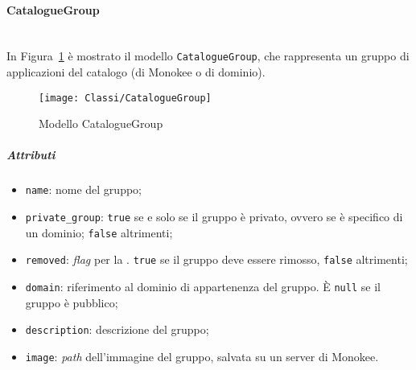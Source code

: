 \paragraph{CatalogueGroup} \mbox{} \\
In Figura~\ref{fig:CatalogueGroup} è mostrato il modello \texttt{CatalogueGroup}, che rappresenta un gruppo di applicazioni del catalogo (di Monokee o di dominio).
\begin{figure}[hbpc]
  \begin{center}
    \texttt{[image: Classi/CatalogueGroup]}
  \caption[Modello CatalogueGroup]{Modello CatalogueGroup}
  \label{fig:CatalogueGroup}
  \end{center} 
\end{figure}
\subparagraph{Attributi}
\begin{itemize}
\item \texttt{name}: nome del gruppo;
\item \texttt{private\_group}: \texttt{true} se e solo se il gruppo è privato, ovvero se è specifico di un dominio; \texttt{false} altrimenti;
\item \texttt{removed}: \textit{flag} per la . \texttt{true} se il gruppo deve essere rimosso, \texttt{false} altrimenti;
\item \texttt{domain}: riferimento al dominio di appartenenza del gruppo. È \texttt{null} se il gruppo è pubblico;
\item \texttt{description}: descrizione del gruppo;
\item \texttt{image}: \textit{path} dell'immagine del gruppo, salvata su un server di Monokee.
\end{itemize}

